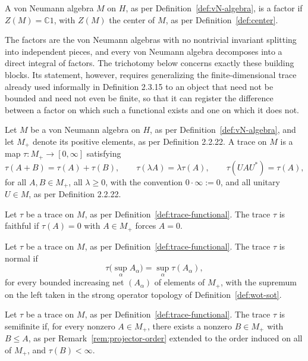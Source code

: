 \begin{definition}[Factor]\label{def:factor}
	A von Neumann algebra $M$ on $H$, as per Definition~\ref{def:vN-algebra},
	is a factor if $Z(M) = \mathbb{C}1$, with $Z(M)$ the center of $M$, as
	per Definition~\ref{def:center}.
\end{definition}

The factors are the von Neumann algebras with no nontrivial invariant
splitting into independent pieces, and every von Neumann algebra
decomposes into a direct integral of factors. The trichotomy below
concerns exactly these building blocks. Its statement, however,
requires generalizing the finite-dimensional trace already used
informally in Definition 2.3.15 to an object that need not be bounded
and need not even be finite, so that it can register the difference
between a factor on which such a functional exists and one on which it
does not.

\begin{definition}[Trace]\label{def:trace-functional}
	Let $M$ be a von Neumann algebra on $H$, as per
	Definition~\ref{def:vN-algebra}, and let $M_+$ denote its positive
	elements, as per Definition 2.2.22. A trace on $M$ is a map $\tau :
	M_+ \to [0, \infty]$ satisfying
	\[
	\tau(A + B) = \tau(A) + \tau(B), \qquad \tau(\lambda A) = \lambda
	\tau(A), \qquad \tau(UAU^*) = \tau(A),
	\]
	for all $A, B \in M_+$, all $\lambda \geq 0$, with the convention $0
	\cdot \infty := 0$, and all unitary $U \in M$, as per Definition 2.2.22.
\end{definition}

\begin{definition}\label{def:faithful-trace}
	Let $\tau$ be a trace on $M$, as per Definition~\ref{def:trace-functional}.
	The trace $\tau$ is faithful if $\tau(A) = 0$ with $A \in M_+$ forces
	$A = 0$.
\end{definition}

\begin{definition}\label{def:normal-trace}
	Let $\tau$ be a trace on $M$, as per Definition~\ref{def:trace-functional}.
	The trace $\tau$ is normal if
	\[
	\tau\Big(\sup_\alpha A_\alpha\Big) = \sup_\alpha \tau(A_\alpha),
	\]
	for every bounded increasing net $(A_\alpha)$ of elements of $M_+$,
	with the supremum on the left taken in the strong operator topology of
	Definition~\ref{def:wot-sot}.
\end{definition}

\begin{definition}\label{def:semifinite-trace}
	Let $\tau$ be a trace on $M$, as per Definition~\ref{def:trace-functional}.
	The trace $\tau$ is semifinite if, for every nonzero $A \in M_+$, there
	exists a nonzero $B \in M_+$ with $B \leq A$, as per
	Remark~\ref{rem:projector-order} extended to the order induced on all
	of $M_+$, and $\tau(B) < \infty$.
\end{definition}

